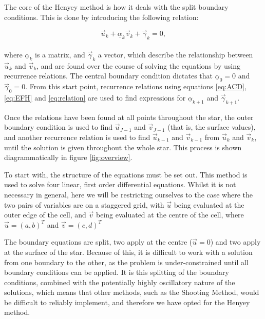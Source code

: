 \documentclass[11pt]{amsart}
\begin{document}
The core of the Henyey method is how it deals with the split boundary conditions.  This is done by introducing the following relation:

\begin{equation} \label{eq:relation}
\vec{u}_{k}  + \underline{\alpha}_{k}  \vec{v}_{k}  + \vec{\gamma}_{k}  = 0,
\end{equation}
\\
where $\underline{\alpha}_{k}$ is a matrix, and $\vec{\gamma}_{k}$ a vector, which describe the relationship between $\vec{u}_{k}$ and $\vec{v}_{k}$, and are found over the course of solving the equations by using recurrence relations.  The central boundary condition dictates that $\underline{\alpha}_{0} = 0$ and $\vec{\gamma}_{0} = 0$.  From this start point, recurrence relations using equations \ref{eq:ACD}, \ref{eq:EFH} and \ref{eq:relation} are used to find expressions for $\underline{\alpha}_{k+1}$ and $\vec{\gamma}_{k+1}$.

Once the relations have been found at all points throughout the star, the outer boundary condition is used to find $\vec{u}_{J-1}$ and $\vec{v}_{J-1}$ (that is, the surface values), and another recurrence relation is used to find $\vec{u}_{k-1}$ and $\vec{v}_{k-1}$ from $\vec{u}_{k}$ and $\vec{v}_{k}$, until the solution is given throughout the whole star.  This process is shown diagrammatically in figure \ref{fig:overview}.






\iffalse

To start with, the structure of the equations must be set out.  This method is used to solve four linear, first order differential equations.  Whilst it is not necessary in general, here we will be restricting ourselves to the case where the two pairs of variables are on a staggered grid, with $\vec{u}$ being evaluated at the outer edge of the cell, and $\vec{v}$ being evaluated at the centre of the cell, where $\vec{u} = \left( a, b \right)^{T}$ and $\vec{v} = \left( c, d \right)^{T}$

The boundary equations are split, two apply at the centre ($\vec{u} = 0$) and two apply at the surface of the star.  Because of this, it is difficult to work with a solution from one boundary to the other, as the problem is under-constrained until all boundary conditions can be applied.  It is this splitting of the boundary conditions, combined with the potentially highly oscillatory nature of the solutions, which means that other methods, such as the Shooting Method, would be difficult to reliably implement, and therefore we have opted for the Henyey method.
\end{document}

